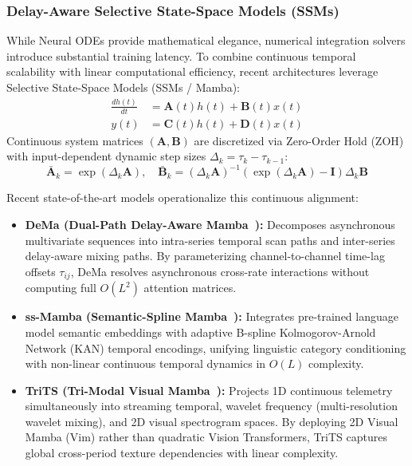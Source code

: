 \subsubsection{Delay-Aware Selective State-Space Models (SSMs)}
While Neural ODEs provide mathematical elegance, numerical integration solvers introduce substantial training latency. To combine continuous temporal scalability with linear computational efficiency, recent architectures leverage Selective State-Space Models (SSMs / Mamba):
\begin{equation}
\begin{aligned}
    \frac{dh(t)}{dt} &= \mathbf{A}(t) h(t) + \mathbf{B}(t) x(t) \\
    y(t) &= \mathbf{C}(t) h(t) + \mathbf{D}(t) x(t)
\end{aligned}
\end{equation}
Continuous system matrices $(\mathbf{A}, \mathbf{B})$ are discretized via Zero-Order Hold (ZOH) with input-dependent dynamic step sizes $\Delta_k = \tau_k - \tau_{k-1}$:
\begin{equation}
    \bar{\mathbf{A}}_k = \exp(\Delta_k \mathbf{A}), \quad \bar{\mathbf{B}}_k = (\Delta_k \mathbf{A})^{-1} (\exp(\Delta_k \mathbf{A}) - \mathbf{I}) \Delta_k \mathbf{B}
\end{equation}

Recent state-of-the-art models operationalize this continuous alignment:
\begin{itemize}
    \item \textbf{DeMa (Dual-Path Delay-Aware Mamba~\cite{An2026DeMa}):} Decomposes asynchronous multivariate sequences into intra-series temporal scan paths and inter-series delay-aware mixing paths. By parameterizing channel-to-channel time-lag offsets $\tau_{ij}$, DeMa resolves asynchronous cross-rate interactions without computing full $O(L^2)$ attention matrices.
    \item \textbf{ss-Mamba (Semantic-Spline Mamba~\cite{Ye2025ssMamba}):} Integrates pre-trained language model semantic embeddings with adaptive B-spline Kolmogorov-Arnold Network (KAN) temporal encodings, unifying linguistic category conditioning with non-linear continuous temporal dynamics in $O(L)$ complexity.
    \item \textbf{TriTS (Tri-Modal Visual Mamba~\cite{Ao2026TriTS}):} Projects 1D continuous telemetry simultaneously into streaming temporal, wavelet frequency (multi-resolution wavelet mixing), and 2D visual spectrogram spaces. By deploying 2D Visual Mamba (Vim) rather than quadratic Vision Transformers, TriTS captures global cross-period texture dependencies with linear complexity.
\end{itemize}

